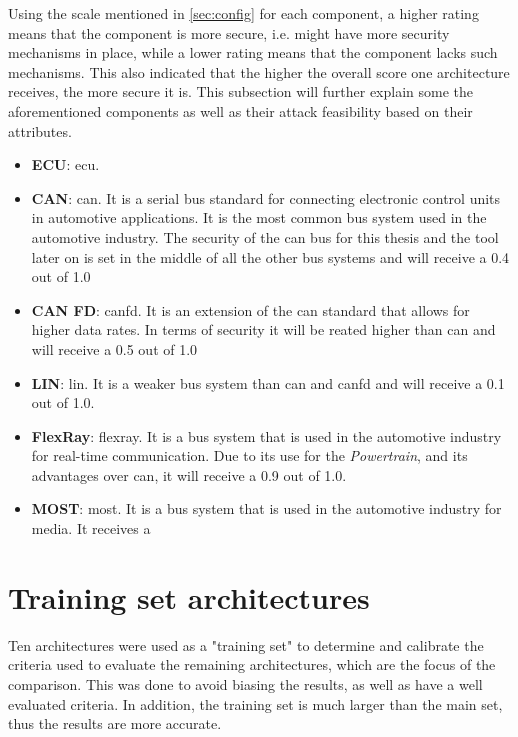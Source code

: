 Using the scale mentioned in \ref{sec:config} for each component, a higher rating means that the component is more secure, i.e. might have more security mechanisms in place,
while a lower rating means that the component lacks such mechanisms.
This also indicated that the higher the overall score one architecture receives, the more secure it is.
This subsection will further explain some the aforementioned components as well as their attack feasibility based on their attributes.

\begin{itemize}
    \item \textbf{ECU}: \gls{ecu}.
    
    \item \textbf{CAN}: \gls{can}. It is a serial bus standard for connecting electronic control units in automotive applications.
    It is the most common bus system used in the automotive industry. 
    The security of the \gls{can} bus for this thesis and the tool later on is set in the middle of all the other bus systems and will receive a 0.4 out of 1.0

    \item \textbf{CAN FD}: \gls{canfd}. It is an extension of the \gls{can} standard that allows for higher data rates.
    In terms of security it will be reated higher than \gls{can} and will receive a 0.5 out of 1.0
    
    \item \textbf{LIN}: \gls{lin}. It is a weaker bus system than \gls{can} and \gls{canfd} and will receive a 0.1 out of 1.0.
    
    \item \textbf{FlexRay}: \gls{flexray}. It is a bus system that is used in the automotive industry for real-time communication.
    Due to its use for the \textit{Powertrain}, and its advantages over \gls{can}, it will receive a 0.9 out of 1.0.

    \item \textbf{MOST}: \gls{most}. It is a bus system that is used in the automotive industry for media.
    It receives a 
\end{itemize}
    
\section{Training set architectures}
\label{sec:trainingarch}

Ten architectures were used as a "training set" to determine and calibrate the criteria used to 
evaluate the remaining architectures, which are the focus of the comparison.
This was done to avoid biasing the results, as well as have a well evaluated criteria.
In addition, the training set is much larger than the main set, thus the results are more accurate.

